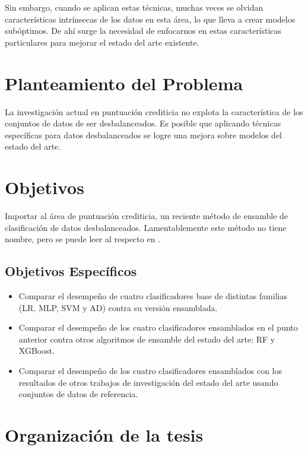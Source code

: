 Sin embargo, cuando se aplican estas técnicas, muchas veces se olvidan características intrínsecas de los datos en esta área, lo que lleva a crear modelos subóptimos. De ahí surge la necesidad de enfocarnos en estas características particulares para mejorar el estado del arte existente.

\section{Planteamiento del Problema}

La investigación actual en puntuación crediticia no explota la característica de los conjuntos de datos de ser desbalanceados. Es posible que aplicando técnicas específicas para datos desbalanceados se logre una mejora sobre modelos del estado del arte.

\section{Objetivos}

Importar al área de puntuación crediticia, un reciente método de ensamble de clasificación de datos desbalanceados. Lamentablemente este método no tiene nombre, pero se puede leer al respecto en \cite{sun2015novel}.

\subsection{Objetivos Específicos}

\begin{itemize}
	\item Comparar el desempeño de cuatro clasificadores base de distintas familias (\ac{LR}, \ac{MLP}, \ac{SVM} y \ac{AD}) contra su versión ensamblada.

	\item Comparar el desempeño de los cuatro clasificadores ensamblados en el punto anterior contra otros algoritmos de ensamble del estado del arte: \ac{RF} y \ac{XGBoost}.

	\item Comparar el desempeño de los cuatro clasificadores ensamblados con los resultados de otros trabajos de investigación del estado del arte usando conjuntos de datos de referencia.
\end{itemize}

\section{Organización de la tesis}

